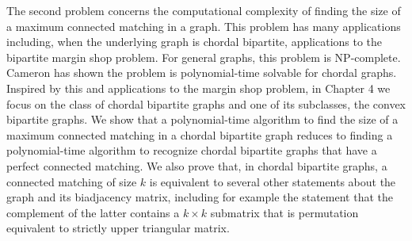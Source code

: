 The second problem concerns the computational complexity of finding the size of a
maximum connected matching in a graph.  This problem has many applications including, when
the underlying graph is chordal bipartite, applications to
the bipartite margin shop problem.  For general graphs, this problem is NP-complete.
Cameron has shown the problem is polynomial-time solvable for chordal graphs. Inspired by this and applications to the margin shop problem,
in Chapter 4 we 
focus on the class of chordal bipartite graphs and one of its subclasses, the convex bipartite graphs.   
We show that a polynomial-time algorithm to find the size of a
maximum connected matching in a chordal bipartite graph reduces to finding a polynomial-time
algorithm to recognize chordal bipartite graphs that have a perfect connected matching.  We
also prove that, in chordal bipartite graphs, a connected matching of size $k$ is equivalent
to several other statements about the graph and its biadjacency matrix, including for example
the statement that the complement of the latter contains a $k \times k$ submatrix that is 
permutation equivalent to strictly upper triangular matrix.

